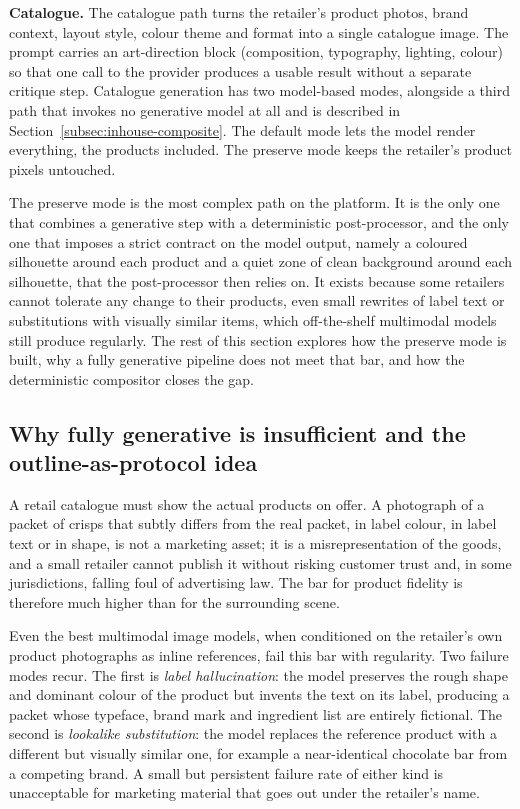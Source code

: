 \textbf{Catalogue.} The catalogue path turns the retailer's product photos, brand context, layout style, colour theme and format into a single catalogue image. The prompt carries an art-direction block (composition, typography, lighting, colour) so that one call to the provider produces a usable result without a separate critique step. Catalogue generation has two model-based modes, alongside a third path that invokes no generative model at all and is described in Section~\ref{subsec:inhouse-composite}. The default mode lets the model render everything, the products included. The preserve mode keeps the retailer's product pixels untouched.

The preserve mode is the most complex path on the platform. It is the only one that combines a generative step with a deterministic post-processor, and the only one that imposes a strict contract on the model output, namely a coloured silhouette around each product and a quiet zone of clean background around each silhouette, that the post-processor then relies on. It exists because some retailers cannot tolerate any change to their products, even small rewrites of label text or substitutions with visually similar items, which off-the-shelf multimodal models still produce regularly. The rest of this section explores how the preserve mode is built, why a fully generative pipeline does not meet that bar, and how the deterministic compositor closes the gap.

\subsection{Why fully generative is insufficient and the outline-as-protocol idea}
\label{subsec:hyb-motivation}

A retail catalogue must show the actual products on offer. A photograph of a packet of crisps that subtly differs from the real packet, in label colour, in label text or in shape, is not a marketing asset; it is a misrepresentation of the goods, and a small retailer cannot publish it without risking customer trust and, in some jurisdictions, falling foul of advertising law. The bar for product fidelity is therefore much higher than for the surrounding scene.

Even the best multimodal image models, when conditioned on the retailer's own product photographs as inline references, fail this bar with regularity. Two failure modes recur. The first is \emph{label hallucination}: the model preserves the rough shape and dominant colour of the product but invents the text on its label, producing a packet whose typeface, brand mark and ingredient list are entirely fictional. The second is \emph{lookalike substitution}: the model replaces the reference product with a different but visually similar one, for example a near-identical chocolate bar from a competing brand. A small but persistent failure rate of either kind is unacceptable for marketing material that goes out under the retailer's name.

